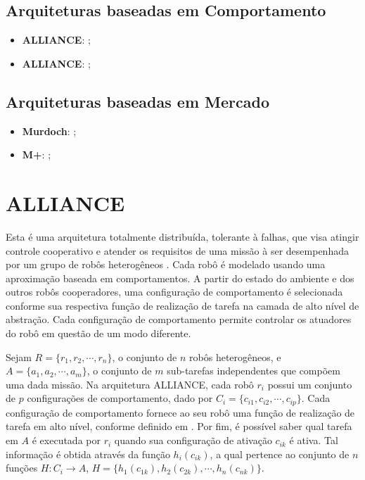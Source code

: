         \subsection{Arquiteturas baseadas em Comportamento} \label{subsec:arch_comportamento}
        
        \begin{itemize}
            \item \textbf{ALLIANCE}: \cite{ref:parker1998alliance};
            \item \textbf{ALLIANCE}: \cite{ref:parker1996lalliance};
            
        \end{itemize}
        
        \subsection{Arquiteturas baseadas em Mercado} \label{subsec:arch_mercado}

        \begin{itemize}
            \item \textbf{Murdoch}: \cite{ref:gerkey2002murdoch};
            \item \textbf{M+}: \cite{ref:botelho1999m+};
            
        \end{itemize}
    
    \section{ALLIANCE} \label{sec:alliance}
    
        Esta é uma arquitetura totalmente distribuída, tolerante à falhas, que visa atingir controle cooperativo e atender os requisitos de uma missão à ser desempenhada por um grupo de robôs heterogêneos \cite{ref:parker1998alliance}. Cada robô é modelado usando uma aproximação baseada em comportamentos. A partir do estado do ambiente e dos outros robôs cooperadores, uma configuração de comportamento é selecionada conforme sua respectiva função de realização de tarefa na camada de alto nível de abstração. Cada configuração de comportamento permite controlar os atuadores do robô em questão de um modo diferente.
        
        Sejam $R=\{r_1, r_2, \cdots, r_n\}$, o conjunto de $n$ robôs heterogêneos, e $A=\{a_1,a_2, \cdots,\allowbreak a_m\}$, o conjunto de $m$ sub-tarefas independentes que compõem uma dada missão. Na arquitetura ALLIANCE, cada robô $r_i$ possui um conjunto de $p$ configurações de comportamento, dado por $C_i=\{c_{i1}, c_{i2},\cdots, c_{ip}\}$. Cada configuração de comportamento fornece ao seu robô uma função de realização de tarefa em alto nível, conforme definido em \cite{ref:brooks1986robust}. Por fim, é possível saber qual tarefa em $A$ é executada por $r_i$ quando sua configuração de ativação $c_{ik}$ é ativa. Tal informação é obtida através da função $h_i(c_{ik})$, a qual pertence ao conjunto de $n$ funções $H : C_i \to A$, $H = \{h_1(c_{1k}),\allowbreak h_2(c_{2k}), \cdots, h_n(c_{nk})\}$.
        
